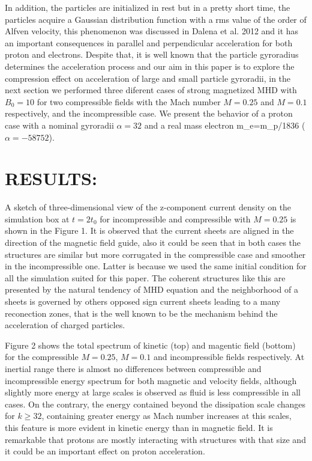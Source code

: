 \documentclass[%
aip,pop,amsmath,amssymb,
 reprint,%
]{revtex4-1}
\begin{document}
In addition, the particles are initialized in rest but in a pretty short time, the particles
acquire a Gaussian distribution function with a rms value of the order of Alfven velocity, 
this phenomenon was discussed in Dalena et al. 2012 and it has an important consequences in 
parallel and perpendicular acceleration for both proton and electrons. Despite that, it is
well known that the particle gyroradius determines the acceleration process and our aim in 
this paper is to explore the compression effect on acceleration of large and small particle 
gyroradii, in the next section we performed three diferent cases of strong magnetized MHD 
with $B_0=10$ for two compressible fields with the Mach number $M=0.25$ and $M=0.1$ 
respectively, and the incompressible case. We present the behavior of a proton case with a 
nominal gyroradii $\alpha= 32$ and a real mass electron m_e=m_p/1836 ($\alpha=-58752$).


\section{\label{sec:level3}RESULTS:}

A sketch of three-dimensional view of the z-component current density on the simulation box at
$t=2t_0$ for incompressible and compressible with $M=0.25$ is shown in the Figure 1. It is 
observed that the current sheets are aligned in the direction of the magnetic field guide, also 
it could be seen that in both cases the structures are similar but more corrugated in the 
compressible case and smoother in the incompressible one. Latter is because we used the same 
initial condition for all the simulation suited for this paper. The coherent structures like
this are presented by the natural tendency of MHD equation and the neighborhood of a sheets
is governed by others opposed sign current sheets leading to a many reconection zones, that 
is the well known to be the mechanism behind the acceleration of charged particles.

Figure 2 shows the total spectrum of kinetic (top) and magentic field (bottom) for the 
compressible $M=0.25$, $M=0.1$ and incompressible fields respectively. At inertial range
there is almost no differences between compressible and incompressible energy spectrum for 
both magnetic and velocity fields, although slightly more energy at large scales is observed
as fluid is less compressible in all cases. On the contrary, the energy contained beyond the dissipation scale 
changes for $k\geq32$, containing greater energy as Mach number increases at this scales, 
this feature is more evident in kinetic energy than in magnetic field. It is remarkable 
that protons are mostly interacting with structures with that size and it could be an 
important effect on proton acceleration.
\end{document}
